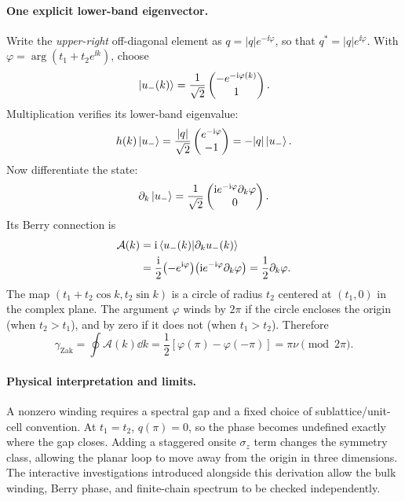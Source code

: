 \paragraph{One explicit lower-band eigenvector.}
Write the \emph{upper-right} off-diagonal element as
$q=|q|e^{-\ii\varphi}$, so that
$q^*=|q|e^{\ii\varphi}$. With
$\varphi=\arg(t_1+t_2e^{\ii k})$, choose
\begin{equation}
\left|u_-(k)\right\rangle=\frac1{\sqrt2}
\begin{pmatrix}-e^{-\mathrm{i}\varphi(k)}\\1\end{pmatrix}.
\end{equation}
Multiplication verifies its lower-band eigenvalue:
\begin{equation}
h(k)\left|u_-\right\rangle
=\frac{|q|}{\sqrt2}
\begin{pmatrix}
e^{-\mathrm{i}\varphi}\\-1
\end{pmatrix}
=-|q|\left|u_-\right\rangle.
\end{equation}
Now differentiate the state:
\begin{equation}
\partial_k\left|u_-\right\rangle
=\frac1{\sqrt2}
\begin{pmatrix}\mathrm{i} e^{-\mathrm{i}\varphi}\partial_k\varphi\\0
\end{pmatrix}.
\end{equation}
Its Berry connection is
\begin{equation}
\begin{aligned}
\mathcal A(k)
&=\mathrm{i}\left\langle u_-(k)\middle|\partial_k u_-(k)\right\rangle\\
&=\frac{\mathrm{i}}{2}
 \bigl(-e^{\mathrm{i}\varphi}\bigr)
 \bigl(\mathrm{i} e^{-\mathrm{i}\varphi}\partial_k\varphi\bigr)
=\frac12\partial_k\varphi.
\end{aligned}
\end{equation}
The map
$(t_1+t_2\cos k,t_2\sin k)$ is a circle of
radius $t_2$ centered at $(t_1,0)$ in the complex plane.
The argument $\varphi$ winds by $2\pi$ if the circle
encloses the origin (when $t_2>t_1$), and by zero
if it does not (when $t_1>t_2$).
Therefore
\begin{equation}
\gamma_{\mathrm{Zak}}
=\oint\mathcal A(k)\dd k
=\frac12[\varphi(\pi)-\varphi(-\pi)]
=\pi\nu\pmod{2\pi}.
\end{equation}

\paragraph{Physical interpretation and limits.}
A nonzero winding requires a spectral gap and a fixed
choice of sublattice/unit-cell convention. At $t_1=t_2$,
$q(\pi)=0$, so the phase becomes undefined exactly where
the gap closes. Adding a staggered onsite $\sigma_z$
term changes the symmetry class, allowing the planar loop
to move away from the origin in three dimensions.
The interactive investigations introduced alongside this derivation allow the bulk winding, Berry phase, and finite-chain spectrum to be checked independently.

